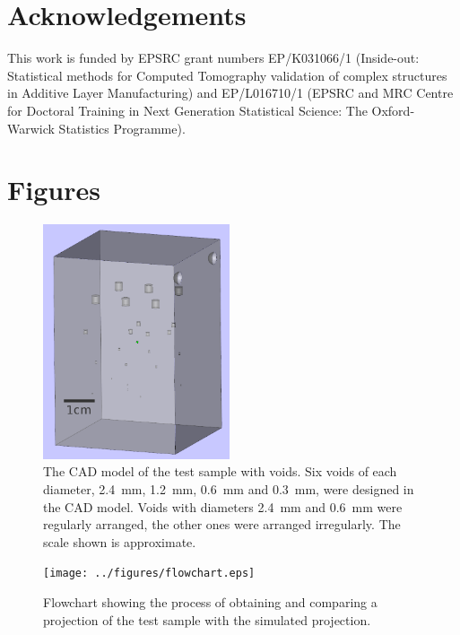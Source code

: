 \documentclass{article}
\renewcommand{\listoffigures}{\begingroup
\tocsection
\tocfile{\listfigurename}{lof}
\endgroup}
\begin{document}
\section{Acknowledgements}
This work is funded by EPSRC grant numbers EP/K031066/1 (Inside-out: Statistical methods for Computed Tomography validation of complex structures in Additive Layer Manufacturing) and EP/L016710/1 (EPSRC and MRC Centre for Doctoral Training in Next Generation Statistical Science: The Oxford-Warwick Statistics Programme).




\listoffigures
\clearpage
\section{Figures}

\begin{figure}[h]
  \centering
  \includegraphics[width=0.49\textwidth]{../figures/inference/TestObject.png}
  \caption{The CAD model of the test sample with voids. Six voids of each diameter, \SI{2.4}{\milli\metre}, \SI{1.2}{\milli\metre}, \SI{0.6}{\milli\metre} and \SI{0.3}{\milli\metre}, were designed in the CAD model. Voids with diameters \SI{2.4}{\milli\metre} and \SI{0.6}{\milli\metre} were regularly arranged, the other ones were arranged irregularly. The scale shown is approximate.}
  \label{fig:inference_testObject}
\end{figure}

\clearpage

\begin{figure}
  \centering
  \texttt{[image: ../figures/flowchart.eps]}
  \caption{Flowchart showing the process of obtaining and comparing a projection of the test sample with the simulated projection.}
  \label{fig:flowchart}
\end{figure}
\end{document}
